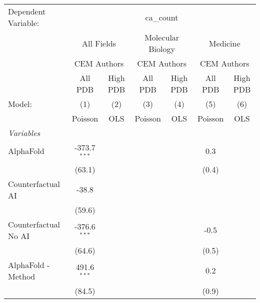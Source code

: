 \begingroup
\centering
\begin{tabular}{lcccccc}
   \tabularnewline \midrule \midrule
   Dependent Variable: & \multicolumn{6}{c}{ca\_count}\\
 & \multicolumn{2}{c}{All Fields} & \multicolumn{2}{c}{Molecular Biology} & \multicolumn{2}{c}{Medicine} \\
\cmidrule(lr){2-3} \cmidrule(lr){4-5} \cmidrule(lr){6-7}
 & \multicolumn{2}{c}{CEM Authors} & \multicolumn{2}{c}{CEM Authors} & \multicolumn{2}{c}{CEM Authors} \\
\cmidrule(lr){2-3} \cmidrule(lr){4-5} \cmidrule(lr){6-7}
 & \multicolumn{1}{c}{All PDB} & \multicolumn{1}{c}{High PDB} & \multicolumn{1}{c}{All PDB} & \multicolumn{1}{c}{High PDB} & \multicolumn{1}{c}{All PDB} & \multicolumn{1}{c}{High PDB} \\
\cmidrule(lr){2-2} \cmidrule(lr){3-3} \cmidrule(lr){4-4} \cmidrule(lr){5-5} \cmidrule(lr){6-6} \cmidrule(lr){7-7}
   Model:                                                     & (1)            & (2)  & (3)     & (4)  & (5)             & (6)\\  
                                                              &  Poisson       & OLS  & Poisson & OLS  & Poisson         & OLS\\  
   \midrule
   \emph{Variables}\\
   AlphaFold                                                  & -373.7$^{***}$ &      &         &      & 0.3             &   \\   
                                                              & (63.1)         &      &         &      & (0.4)           &   \\   
   Counterfactual AI                                          & -38.8          &      &         &      &                 &   \\   
                                                              & (59.6)         &      &         &      &                 &   \\   
   Counterfactual No AI                                       & -376.6$^{***}$ &      &         &      & -0.5            &   \\   
                                                              & (64.6)         &      &         &      & (0.5)           &   \\   
   AlphaFold - Method                                         & 491.6$^{***}$  &      &         &      & 0.2             &   \\   
                                                              & (84.5)         &      &         &      & (0.9)           &   \\   

\end{tabular}
